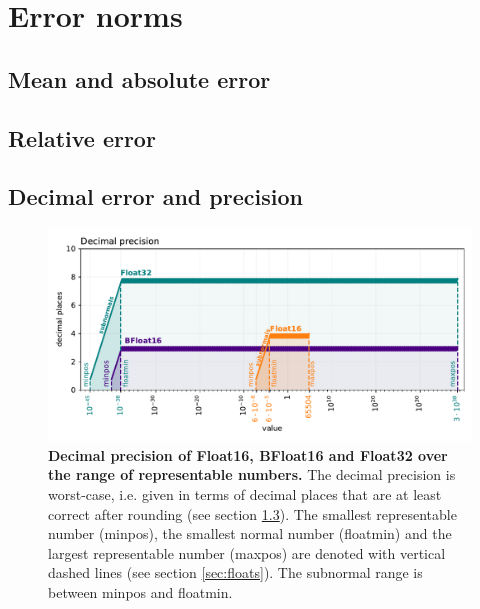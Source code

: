 \section{Error norms}
\label{sec:error_norms}

\subsection{Mean and absolute error}
\label{sec:meanabs_error}

\subsection{Relative error}
\label{sec:relative_error}
	
\subsection{Decimal error and precision}
\label{sec:decimal_precision}

\begin{figure}[tbhp]
	\includegraphics[width=1\textwidth]{Figures/methods/float32_16_bfloat_decprec.pdf}
	\caption{\textbf{Decimal precision of Float16, BFloat16 and Float32 over the range of representable numbers.}
	The decimal precision is worst-case, i.e. given in terms of decimal places that are at least correct after rounding
	(see section \ref{sec:decimal_precision}). The smallest representable number (minpos), the smallest normal number
	(floatmin) and the largest representable number (maxpos) are denoted with vertical dashed lines (see section \ref{sec:floats}).
	The subnormal range is between minpos and floatmin.}
	\label{fig:methods_decprec_floats}
\end{figure}



